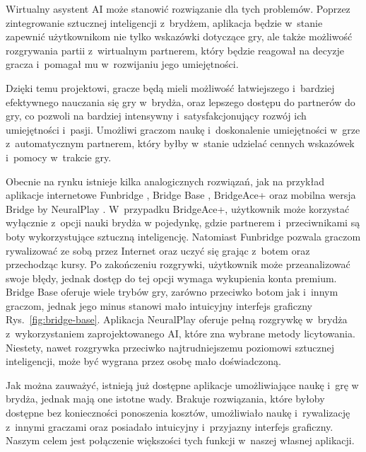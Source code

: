 Wirtualny asystent AI może stanowić rozwiązanie dla tych problemów. Poprzez
zintegrowanie sztucznej inteligencji z~brydżem, aplikacja będzie w~stanie
zapewnić użytkownikom nie tylko wskazówki dotyczące gry, ale także możliwość
rozgrywania partii z~wirtualnym partnerem, który będzie reagował na decyzje
gracza i~pomagał mu w~rozwijaniu jego umiejętności.

Dzięki temu projektowi, gracze będą mieli możliwość łatwiejszego i~bardziej
efektywnego nauczania się gry w~brydża, oraz lepszego dostępu do partnerów
do gry, co pozwoli na bardziej intensywny i~satysfakcjonujący rozwój ich
umiejętności i~pasji. Umożliwi graczom naukę i~doskonalenie umiejętności
w~grze z~automatycznym partnerem, który byłby w~stanie udzielać cennych
wskazówek i~pomocy w~trakcie gry.
\newline

Obecnie na rynku istnieje kilka analogicznych rozwiązań, jak na przykład
aplikacje internetowe Funbridge \cite{funbridge}, Bridge Base \cite{bridgebase},
BridgeAce+ \cite{bridgeace} oraz mobilna wersja Bridge by NeuralPlay
\cite{neuralplay}. W~przypadku BridgeAce+, użytkownik może korzystać wyłącznie
z~opcji nauki brydża w pojedynkę, gdzie partnerem i~przeciwnikami są boty
wykorzystujące sztuczną inteligencję. Natomiast Funbridge pozwala graczom
rywalizować ze sobą przez Internet oraz uczyć się grając z~botem oraz
przechodząc kursy. Po zakończeniu rozgrywki, użytkownik może przeanalizować
swoje błędy, jednak dostęp do tej opcji wymaga wykupienia konta premium.
Bridge Base oferuje wiele trybów gry, zarówno przeciwko botom jak i~innym
graczom, jednak jego minus stanowi mało intuicyjny interfejs graficzny
Rys.~\ref{fig:bridge-base}. Aplikacja NeuralPlay oferuje pełną rozgrywkę w~brydża
z~wykorzystaniem zaprojektowanego AI, które zna wybrane metody licytowania.
Niestety, nawet rozgrywka przeciwko najtrudniejszemu poziomowi sztucznej
inteligencji, może być wygrana przez osobę mało doświadczoną.
\newline

Jak można zauważyć, istnieją już dostępne aplikacje umożliwiające naukę
i~grę w brydża, jednak mają one istotne wady. Brakuje rozwiązania, które
byłoby dostępne bez konieczności ponoszenia kosztów, umożliwiało naukę
i~rywalizację z~innymi graczami oraz posiadało intuicyjny i~przyjazny
interfejs graficzny. Naszym celem jest połączenie większości tych funkcji
w~naszej własnej aplikacji.



\FloatBarrier

